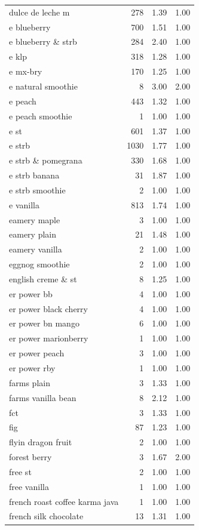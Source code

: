 \begin{table}
\begin{tabular}{lrrr}
dulce de leche m & 278 & 1.39 & 1.00 \\
e blueberry & 700 & 1.51 & 1.00 \\
e blueberry \& strb & 284 & 2.40 & 1.00 \\
e klp & 318 & 1.28 & 1.00 \\
e mx-bry & 170 & 1.25 & 1.00 \\
e natural smoothie & 8 & 3.00 & 2.00 \\
e peach & 443 & 1.32 & 1.00 \\
e peach smoothie & 1 & 1.00 & 1.00 \\
e st & 601 & 1.37 & 1.00 \\
e strb & 1030 & 1.77 & 1.00 \\
e strb \& pomegrana & 330 & 1.68 & 1.00 \\
e strb banana & 31 & 1.87 & 1.00 \\
e strb smoothie & 2 & 1.00 & 1.00 \\
e vanilla & 813 & 1.74 & 1.00 \\
eamery maple & 3 & 1.00 & 1.00 \\
eamery plain & 21 & 1.48 & 1.00 \\
eamery vanilla & 2 & 1.00 & 1.00 \\
eggnog smoothie & 2 & 1.00 & 1.00 \\
english creme \& st & 8 & 1.25 & 1.00 \\
er power bb & 4 & 1.00 & 1.00 \\
er power black cherry & 4 & 1.00 & 1.00 \\
er power bn mango & 6 & 1.00 & 1.00 \\
er power marionberry & 1 & 1.00 & 1.00 \\
er power peach & 3 & 1.00 & 1.00 \\
er power rby & 1 & 1.00 & 1.00 \\
farms plain & 3 & 1.33 & 1.00 \\
farms vanilla bean & 8 & 2.12 & 1.00 \\
fct & 3 & 1.33 & 1.00 \\
fig & 87 & 1.23 & 1.00 \\
flyin dragon fruit & 2 & 1.00 & 1.00 \\
forest berry & 3 & 1.67 & 2.00 \\
free st & 2 & 1.00 & 1.00 \\
free vanilla & 1 & 1.00 & 1.00 \\
french roast coffee karma java & 1 & 1.00 & 1.00 \\
french silk chocolate & 13 & 1.31 & 1.00 \\

\end{tabular}
\end{table}
